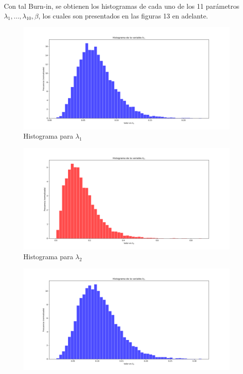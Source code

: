 \documentclass[letterpaper]{article}
\newcommand{\1}{\mathds{1}}
\theoremstyle{definition}
\theoremstyle{definition}
\theoremstyle{definition}
\theoremstyle{definition}
\theoremstyle{definition}
\begin{document}
\begin{itemize}
    Con tal Burn-in, se obtienen los histogramas de cada uno de los 11 parámetros $\lambda_1,...,\lambda_{10},\beta$, 
    los cuales son presentados en las figuras 13 en adelante. 
    \newline
    \begin{figure}[h!]
        \centering
        \includegraphics[width=\linewidth]{13.png}
        \caption{Histograma para $\lambda_{1}$}
    \end{figure} 
    \begin{figure}[h!]
        \centering
        \includegraphics[width=\linewidth]{14.png}
        \caption{Histograma para $\lambda_{2}$}
    \end{figure} 
    \begin{figure}[h!]
        \centering
        \includegraphics[width=\linewidth]{15.png}

\end{figure}
\end{itemize}
\end{document}
